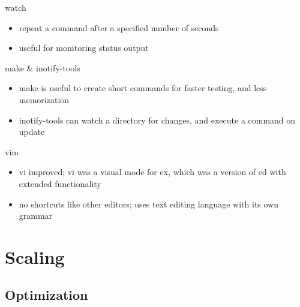 \documentclass{beamer}
\begin{document}
\begin{frame}{watch}
  \begin{itemize}
    \item repeat a command after a specified number of seconds
    \item useful for monitoring status output
  \end{itemize}
\end{frame}

\begin{frame}{make \& inotify-tools}
  \begin{itemize}
    \item make is useful to create short commands for faster testing, and less
      memorization
    \item inotify-tools can watch a directory for changes, and execute a
      command on update
  \end{itemize}
\end{frame}

\begin{frame}{vim}
  \begin{itemize}
    \item vi improved; vi was a visual mode for ex, which was a version of ed
      with extended functionality
    \item no shortcuts like other editors; uses text editing language with its
      own grammar
  \end{itemize}
\end{frame}

\section{Scaling}

\subsection{Optimization}
\end{document}

